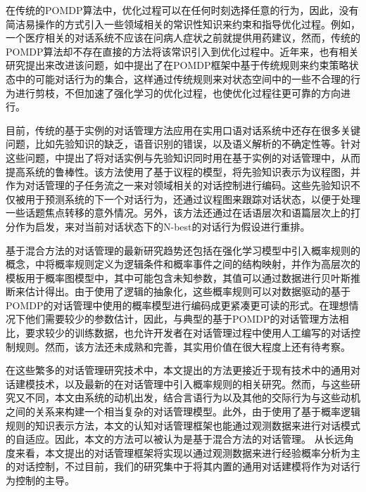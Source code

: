 \begin{enumerate}
在传统的POMDP算法中，优化过程可以在任何时刻选择任意的行为，因此，没有简洁易操作的方式引入一些领域相关的常识性知识来约束和指导优化过程。例如，一个医疗相关的对话系统不应该在问病人症状之前就提供用药建议，然而，传统的POMDP算法却不存在直接的方法将该常识引入到优化过程中。近年来，也有相关研究提出来改进该问题，如\cite{Lemon2006, Williams2008b}中提出了在POMDP框架中基于传统规则来约束策略状态中的可能对话行为的集合，这样通过传统规则来对状态空间中的一些不合理的行为进行剪枝，不但加速了强化学习的优化过程，也使优化过程往更可靠的方向进行。

目前，传统的基于实例的对话管理方法应用在实用口语对话系统中还存在很多关键问题，比如先验知识的缺乏，语音识别的错误，以及语义解析的不确定性等。针对这些问题，\cite{Lee2009b}中提出了将对话实例与先验知识同时用在基于实例的对话管理中，从而提高系统的鲁棒性。该方法使用了基于议程的模型，将先验知识表示为议程图，并作为对话管理的子任务流之一来对领域相关的对话控制进行编码。这些先验知识不仅被用于预测系统的下一个对话行为，还通过议程图来跟踪对话状态，以便于处理一些话题焦点转移的意外情况。另外，该方法还通过在话语层次和语篇层次上的打分作为启发，来对当前对话状态下的N-best的对话行为假设进行重排。

基于混合方法的对话管理的最新研究趋势还包括在强化学习模型中引入概率规则的概念，\cite{Lison2015}中将概率规则定义为逻辑条件和概率事件之间的结构映射，并作为高层次的模板用于概率图模型中，其中可能包含未知参数，其值可以通过数据进行贝叶斯推断来估计得出。由于使用了逻辑的抽象化，这些概率规则可以对数据驱动的基于POMDP的对话管理中使用的概率模型进行编码成更紧凑更可读的形式。在理想情况下他们需要较少的参数估计，因此，与典型的基于POMDP的对话管理方法相比，要求较少的训练数据，也允许开发者在对话管理过程中使用人工编写的对话控制规则。然而，该方法还未成熟和完善，其实用价值在很大程度上还有待考察。

\end{enumerate}

在这些繁多的对话管理研究技术中，本文提出的方法更接近于现有技术中的通用对话建模技术，以及最新的在对话管理中引入概率规则的相关研究。然而，与这些研究又不同，本文由系统的动机出发，结合言语行为以及其他的交际行为与这些动机之间的关系来构建一个相当复杂的对话管理模型。此外，由于使用了基于概率逻辑规则的知识表示方法，本文的认知对话管理框架也能通过观测数据来进行对话模式的自适应。因此，本文的方法可以被认为是基于混合方法的对话管理。
从长远角度来看，本文提出的对话管理框架将实现以通过观测数据来进行经验概率分析为主的对话控制，不过目前，我们的研究集中于将其内置的通用对话建模将作为对话行为控制的主导。


